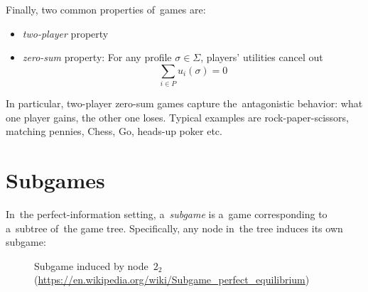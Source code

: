 Finally, two common properties of~games are:
\begin{itemize}
  \item \emph{two-player} property
  \item \emph{zero-sum} property:
    For any profile $\sigma \in \Sigma$, players' utilities cancel out
    \[ \sum _{i \in P} u _i (\sigma) = 0 \]
\end{itemize}
In particular, two-player zero-sum games capture the~antagonistic behavior:
what one player gains, the other one loses.
Typical examples are rock-paper-scissors, matching pennies, Chess, Go, heads-up poker etc.

\section{Subgames}
In~the perfect-information setting, a~\emph{subgame} is a~game corresponding to a~subtree of~the game tree.
Specifically, any node in~the tree induces its own subgame:
\begin{figure}[H]
  \centering
  \scriptsize
  \def\svgwidth{.7\textwidth}
  
  \def\captionTitle{Subgame induced by node~$2_2$}
  \caption[\captionTitle]{\captionTitle{}\\ (\href{https://en.wikipedia.org/wiki/Subgame_perfect_equilibrium}{https://en.wikipedia.org/wiki/Subgame\_perfect\_equilibrium})}
  \label{fig:ext-form-subgame}
\end{figure}


